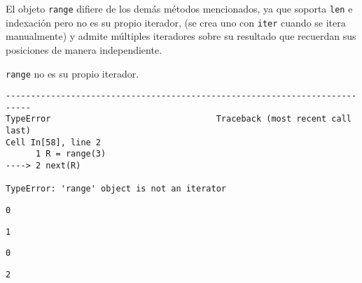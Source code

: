 El objeto \texttt{range} difiere de los demás métodos mencionados, ya
que soporta \texttt{len} e indexación pero no es su propio iterador, (se crea uno
con \texttt{iter} cuando se itera manualmente) y admite múltiples
iteradores sobre su resultado que recuerdan sus posiciones de manera
independiente.
\\
\begin{code} \texttt{range} no es su propio iterador.
\begin{Shaded}
\begin{Highlighting}[]
\OperatorTok{=} \NormalTok{(}\NormalTok{)}
\end{Highlighting}
\end{Shaded}

\begin{verbatim}
---------------------------------------------------------------------------
TypeError                                 Traceback (most recent call last)
Cell In[58], line 2
      1 R = range(3)
----> 2 next(R)

TypeError: 'range' object is not an iterator
\end{verbatim}

\begin{Shaded}
\begin{Highlighting}[]
\OperatorTok{=} 
\end{Highlighting}
\end{Shaded}

\begin{verbatim}
0
\end{verbatim}

\begin{Shaded}
\begin{Highlighting}[]
\end{Highlighting}
\end{Shaded}

\begin{verbatim}
1
\end{verbatim}

\begin{Shaded}
\begin{Highlighting}[]
\OperatorTok{=} 
\end{Highlighting}
\end{Shaded}

\begin{verbatim}
0
\end{verbatim}

\begin{Shaded}
\begin{Highlighting}[]
\end{Highlighting}
\end{Shaded}

\begin{verbatim}
2
\end{verbatim}
\end{code}

